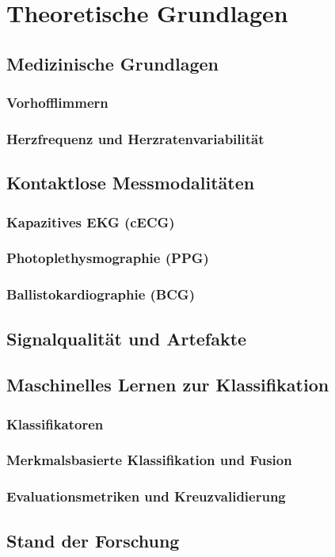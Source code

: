 \chapter{Theoretische Grundlagen}
\section{Medizinische Grundlagen}
\subsection{Vorhofflimmern}
\subsection{Herzfrequenz und Herzratenvariabilität}
\section{Kontaktlose Messmodalitäten}
\subsection{Kapazitives EKG (cECG)}
\subsection{Photoplethysmographie (PPG)}
\subsection{Ballistokardiographie (BCG)}
\section{Signalqualität und Artefakte}
\section{Maschinelles Lernen zur Klassifikation}
\subsection{Klassifikatoren}
\subsection{Merkmalsbasierte Klassifikation und Fusion}
\subsection{Evaluationsmetriken und Kreuzvalidierung}
\section{Stand der Forschung}